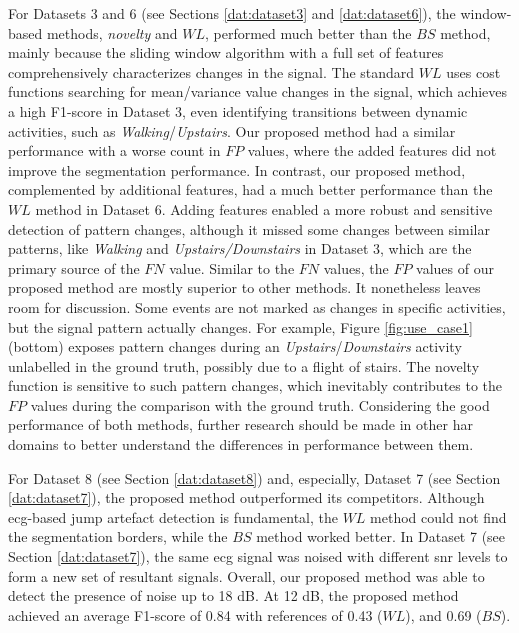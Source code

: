 For Datasets 3 and 6 (see Sections \ref{dat:dataset3} and \ref{dat:dataset6}), the window-based methods, \textit{novelty} and $WL$, performed much better than the $BS$ method, mainly because the sliding window algorithm with a full set of features comprehensively characterizes changes in the signal.
The standard $WL$ uses cost functions searching for mean/variance value changes in the signal, which achieves a high F1-score in Dataset 3, even identifying transitions between dynamic activities, such as \textit{Walking}/\textit{Upstairs}.
Our proposed method had a similar performance with a worse count in $FP$ values, where the added features did not improve the segmentation performance.
In contrast, our proposed method, complemented by additional features, had a much better performance than the $WL$ method in Dataset 6.
Adding features enabled a more robust and sensitive detection of pattern changes, although it missed some changes between similar patterns, like \textit{Walking} and \textit{Upstairs/Downstairs} in Dataset 3, which are the primary source of the $FN$ value.
Similar to the $FN$ values, the $FP$ values of our proposed method are mostly superior to other methods. It nonetheless leaves room for discussion. Some events are not marked as changes in specific activities, but the signal pattern actually changes. For example, Figure \ref{fig:use_case1}(bottom) exposes pattern changes during an \textit{Upstairs}/\textit{Downstairs} activity unlabelled in the ground truth, possibly due to a flight of stairs. The novelty function is sensitive to such pattern changes, which inevitably contributes to the $FP$ values during the comparison with the ground truth.
Considering the good performance of both methods, further research should be made in other \gls{har} domains to better understand the differences in performance between them.

For Dataset 8 (see Section \ref{dat:dataset8}) and, especially, Dataset 7 (see Section \ref{dat:dataset7}), the proposed method outperformed its competitors. Although \gls{ecg}-based jump artefact detection is fundamental, the $WL$ method could not find the segmentation borders, while the $BS$ method worked better. In Dataset 7 (see Section \ref{dat:dataset7}), the same \gls{ecg} signal was noised with different \gls{snr} levels to form a new set of resultant signals. Overall, our proposed method was able to detect the presence of noise up to 18 dB. At 12 dB, the proposed method achieved an average F1-score of 0.84 with references of 0.43 ($WL$), and 0.69 ($BS$).

